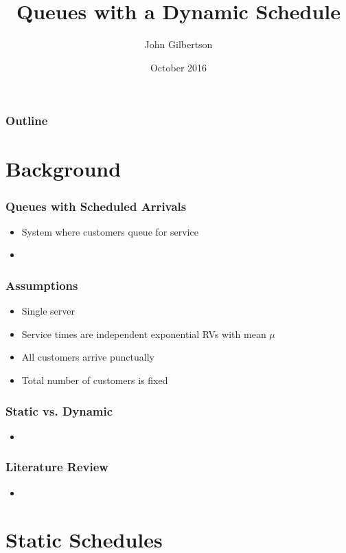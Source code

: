 \documentclass{beamer}
\title{Queues with a Dynamic Schedule}
\author{John Gilbertson}
\date{October 2016}
\begin{document}
\begin{frame}
	\titlepage
\end{frame}

\begin{frame}
	\frametitle{Outline}
	\tableofcontents
\end{frame}

\section{Background}

\begin{frame}
	\frametitle{Queues with Scheduled Arrivals}

	\begin{itemize}
		\item System where customers queue for service
		\item 
	\end{itemize}
\end{frame}

\begin{frame}
	\frametitle{Assumptions}

	\begin{itemize}
		\item Single server
		\item Service times are independent exponential RVs with mean $\mu$
		\item All customers arrive punctually
		\item Total number of customers is fixed
	\end{itemize}
\end{frame}

\begin{frame}
	\frametitle{Static vs. Dynamic}

	\begin{itemize}
		\item 
	\end{itemize}
\end{frame}

\begin{frame}
	\frametitle{Literature Review}

	\begin{itemize}
		\item 
	\end{itemize}
\end{frame}

\section{Static Schedules}
\end{document}

